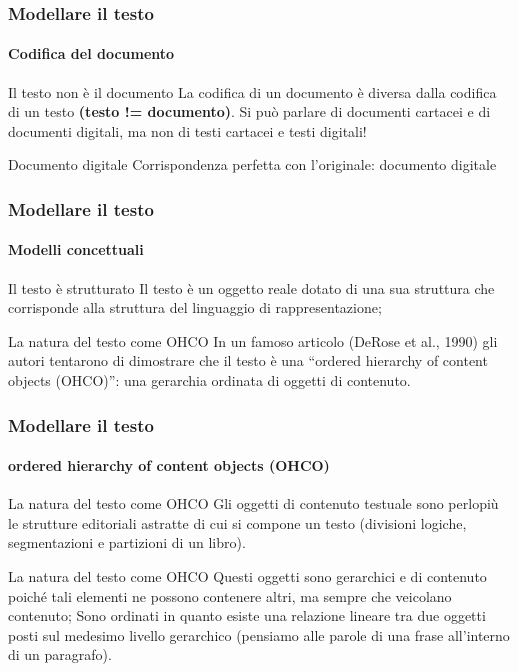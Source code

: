 \begin{frame}
	\frametitle{Modellare il testo}
	\framesubtitle{Codifica del documento}
	\addtocounter{nframe}{1}

	\begin{block}{Il testo non è il documento}
		La codifica di un documento è diversa dalla codifica di un
		testo \textbf{(testo != documento)}. Si può parlare di documenti cartacei e di documenti
		digitali, ma non di testi cartacei e testi digitali!
	\end{block}

	\begin{block}{Documento digitale}
		Corrispondenza perfetta con l'originale: documento digitale
	\end{block}


\end{frame}


\begin{frame}
	\frametitle{Modellare il testo}
	\framesubtitle{Modelli concettuali}
	\addtocounter{nframe}{1}

	\begin{block}{Il testo è strutturato}
		Il testo è un oggetto reale dotato di una sua struttura che corrisponde alla struttura del linguaggio di rappresentazione;
	\end{block}

	\begin{block}{La natura del testo come OHCO}
		In un famoso articolo (DeRose et al., 1990) gli autori tentarono di dimostrare che il testo è una ``ordered hierarchy of content objects (OHCO)'': una gerarchia ordinata di oggetti di contenuto.
	\end{block}
\end{frame}


\begin{frame}
	\frametitle{Modellare il testo}
	\framesubtitle{ordered hierarchy of content objects (OHCO)}
	\addtocounter{nframe}{1}

	\begin{block}{La natura del testo come OHCO}
		Gli oggetti di contenuto testuale sono perlopiù le strutture editoriali astratte di cui si compone un testo (divisioni logiche, segmentazioni e partizioni di un libro).
	\end{block}

	\begin{block}{La natura del testo come OHCO}
		Questi oggetti sono gerarchici e di contenuto poiché tali elementi ne possono contenere altri, ma sempre che veicolano contenuto;  Sono ordinati in quanto esiste una relazione lineare tra due oggetti posti sul medesimo livello gerarchico (pensiamo alle parole di una frase all'interno di un paragrafo).
	\end{block}
\end{frame}

